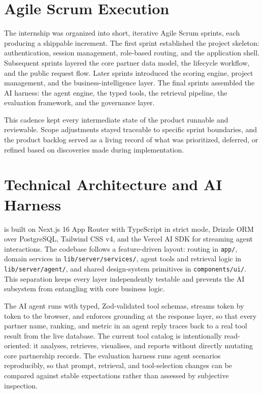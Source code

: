 \section*{Agile Scrum Execution}

The internship was organized into short, iterative Agile Scrum sprints, each producing a shippable increment. The first sprint established the project skeleton: authentication, session management, role-based routing, and the application shell. Subsequent sprints layered the core partner data model, the lifecycle workflow, and the public request flow. Later sprints introduced the scoring engine, project management, and the business-intelligence layer. The final sprints assembled the AI harness: the agent engine, the typed tools, the retrieval pipeline, the evaluation framework, and the governance layer.

This cadence kept every intermediate state of the product runnable and reviewable. Scope adjustments stayed traceable to specific sprint boundaries, and the product backlog served as a living record of what was prioritized, deferred, or refined based on discoveries made during implementation.

\section*{Technical Architecture and AI Harness}

\projectname{} is built on Next.js 16 App Router with TypeScript in strict mode, Drizzle ORM over PostgreSQL, Tailwind CSS v4, and the Vercel AI SDK for streaming agent interactions. The codebase follows a feature-driven layout: routing in \texttt{app/}, domain services in \texttt{lib/server/services/}, agent tools and retrieval logic in \texttt{lib/server/agent/}, and shared design-system primitives in \texttt{components/ui/}. This separation keeps every layer independently testable and prevents the AI subsystem from entangling with core business logic.

The AI agent runs with typed, Zod-validated tool schemas, streams token by token to the browser, and enforces grounding at the response layer, so that every partner name, ranking, and metric in an agent reply traces back to a real tool result from the live database. The current tool catalog is intentionally read-oriented: it analyses, retrieves, visualises, and reports without directly mutating core partnership records. The evaluation harness runs agent scenarios reproducibly, so that prompt, retrieval, and tool-selection changes can be compared against stable expectations rather than assessed by subjective inspection.

